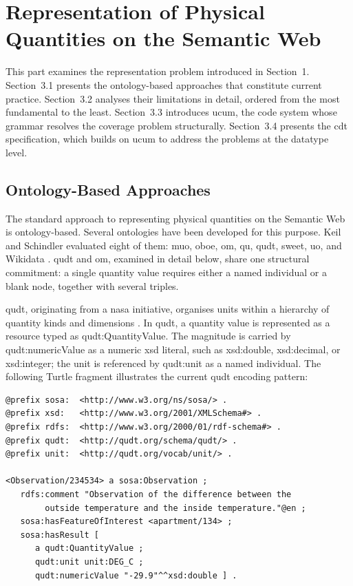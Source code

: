 \chapter{Representation of Physical Quantities on the Semantic Web}

This part examines the representation problem introduced in Section~1. 
Section~3.1 presents the ontology-based approaches that constitute current practice. 
Section~3.2 analyses their limitations in detail, ordered from the most fundamental to the least. 
Section~3.3 introduces \ac{ucum}, the code system whose grammar resolves the coverage problem structurally. 
Section~3.4 presents the \ac{cdt} specification, which builds on \ac{ucum} to address the  problems at the datatype level.

\section{Ontology-Based Approaches}

The standard approach to representing physical quantities on the Semantic Web is ontology-based. 
Several ontologies have been developed for this purpose. 
Keil and Schindler evaluated eight of them: \ac{muo}, \ac{oboe}, \ac{om}, \ac{qu}, \ac{qudt}, \ac{sweet}, \ac{uo}, and Wikidata \cite{keil2018comparison}. 
\ac{qudt} and \ac{om}, examined in detail below, share one structural commitment: a single quantity value requires either a named individual or a blank node, together with several triples.

\ac{qudt}, originating from a \ac{nasa} initiative, organises units within a hierarchy of quantity kinds and dimensions \cite{hodgson2014quantities}. 
In \ac{qudt}, a quantity value is represented as a resource typed as \textsf{qudt:QuantityValue}. 
The magnitude is carried by \textsf{qudt:numericValue} as a numeric \ac{xsd} literal, such as \textsf{xsd:double}, \textsf{xsd:decimal}, or \textsf{xsd:integer}; the unit is referenced by \textsf{qudt:unit} as a named individual. 
The following Turtle fragment illustrates the current \ac{qudt} encoding pattern:

\begin{verbatim}
@prefix sosa:  <http://www.w3.org/ns/sosa/> .
@prefix xsd:   <http://www.w3.org/2001/XMLSchema#> .
@prefix rdfs:  <http://www.w3.org/2000/01/rdf-schema#> .
@prefix qudt:  <http://qudt.org/schema/qudt/> .
@prefix unit:  <http://qudt.org/vocab/unit/> .

<Observation/234534> a sosa:Observation ;
   rdfs:comment "Observation of the difference between the
        outside temperature and the inside temperature."@en ;
   sosa:hasFeatureOfInterest <apartment/134> ;
   sosa:hasResult [
      a qudt:QuantityValue ;
      qudt:unit unit:DEG_C ;
      qudt:numericValue "-29.9"^^xsd:double ] .
\end{verbatim}

